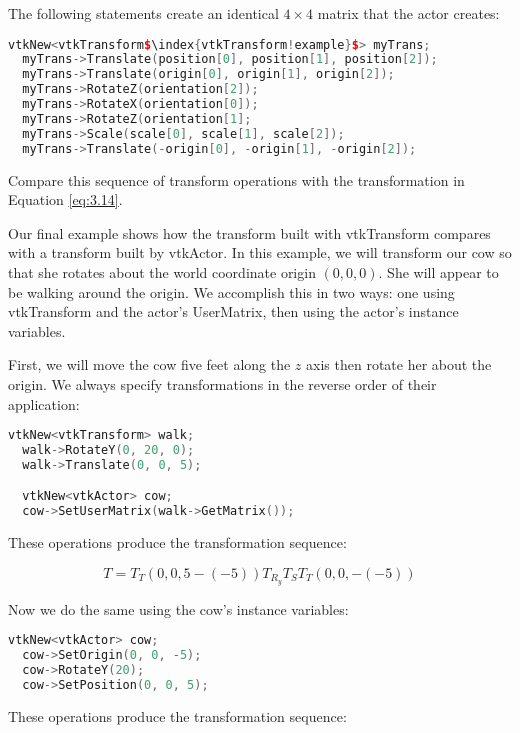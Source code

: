 The following statements create an identical $4 \times 4$ matrix that the actor creates:

\begin{lstlisting}[language=C++, caption={}, escapechar=\$]
  vtkNew<vtkTransform$\index{vtkTransform!example}$> myTrans;
  myTrans->Translate(position[0], position[1], position[2]);
  myTrans->Translate(origin[0], origin[1], origin[2]);
  myTrans->RotateZ(orientation[2]);
  myTrans->RotateX(orientation[0]);
  myTrans->RotateZ(orientation[1];
  myTrans->Scale(scale[0], scale[1], scale[2]);
  myTrans->Translate(-origin[0], -origin[1], -origin[2]);
\end{lstlisting}

\noindent Compare this sequence of transform operations with the transformation in Equation \eqref{eq:3.14}.

Our final example shows how the transform built with vtkTransform compares with a transform built by vtkActor. In this example, we will transform our cow so that she rotates about the world coordinate origin $(0,0,0)$. She will appear to be walking around the origin. We accomplish this in two ways: one using vtkTransform and the actor's UserMatrix, then using the actor's instance variables.

First, we will move the cow five feet along the $z$ axis then rotate her about the origin. We always specify transformations in the reverse order of their application:

\begin{lstlisting}[language=C++, caption={}]
  vtkNew<vtkTransform> walk;
  walk->RotateY(0, 20, 0);
  walk->Translate(0, 0, 5);

  vtkNew<vtkActor> cow;
  cow->SetUserMatrix(walk->GetMatrix());
\end{lstlisting}

\noindent These operations produce the transformation sequence:

\begin{equation}\label{eq:3.15}
T=T_T(0,0,5-(-5))T_{R_y}T_ST_T(0,0,-(-5))
\end{equation}

\noindent Now we do the same using the cow's instance variables:

\begin{lstlisting}[language=C++, caption={}]
  vtkNew<vtkActor> cow;
  cow->SetOrigin(0, 0, -5);
  cow->RotateY(20);
  cow->SetPosition(0, 0, 5);
\end{lstlisting}

\noindent These operations produce the transformation sequence:

